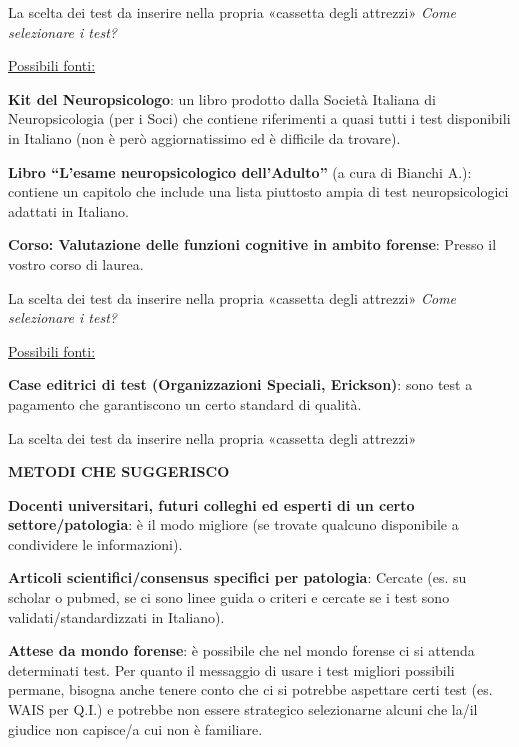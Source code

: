 \documentclass[
  ignorenonframetext,
]{beamer}
\begin{document}
\begin{frame}{\small La scelta dei test da inserire nella propria
«cassetta degli attrezzi»}
\label{la-scelta-dei-test-da-inserire-nella-propria-cassetta-degli-attrezzi-1}
\emph{Come selezionare i test?}

\underline{Possibili fonti:}

\textbf{Kit del Neuropsicologo}: un libro prodotto dalla Società
Italiana di Neuropsicologia (per i Soci) che contiene riferimenti a
quasi tutti i test disponibili in Italiano (non è però aggiornatissimo
ed è difficile da trovare).

\textbf{Libro ``L'esame neuropsicologico dell'Adulto''} (a cura di
Bianchi A.): contiene un capitolo che include una lista piuttosto ampia
di test neuropsicologici adattati in Italiano.

\textbf{Corso: Valutazione delle funzioni cognitive in ambito forense}:
Presso il vostro corso di laurea.
\end{frame}

\begin{frame}{\small La scelta dei test da inserire nella propria
«cassetta degli attrezzi»}
\label{la-scelta-dei-test-da-inserire-nella-propria-cassetta-degli-attrezzi-2}
\emph{Come selezionare i test?}

\underline{Possibili fonti:}

\textbf{Case editrici di test (Organizzazioni Speciali, Erickson)}: sono
test a pagamento che garantiscono un certo standard di qualità.
\end{frame}

\begin{frame}{\small La scelta dei test da inserire nella propria
«cassetta degli attrezzi»}
\label{la-scelta-dei-test-da-inserire-nella-propria-cassetta-degli-attrezzi-3}
\begin{center}
  \textbf{METODI CHE SUGGERISCO}
\end{center}

\textbf{Docenti universitari, futuri colleghi ed esperti di un certo
settore/patologia}: è il modo migliore (se trovate qualcuno disponibile
a condividere le informazioni).

\textbf{Articoli scientifici/consensus specifici per patologia}: Cercate
(es. su scholar o pubmed, se ci sono linee guida o criteri e cercate se
i test sono validati/standardizzati in Italiano).

\textbf{Attese da mondo forense}: è possibile che nel mondo forense ci
si attenda determinati test. Per quanto il messaggio di usare i test
migliori possibili permane, bisogna anche tenere conto che ci si
potrebbe aspettare certi test (es. WAIS per Q.I.) e potrebbe non essere
strategico selezionarne alcuni che la/il giudice non capisce/a cui non è
familiare.
\end{frame}
\end{document}
